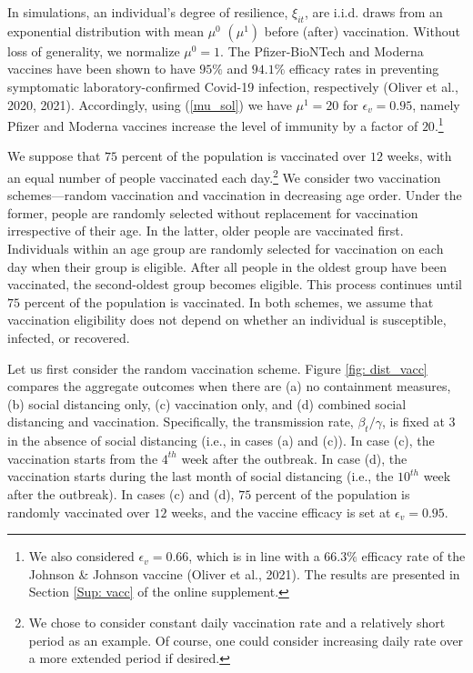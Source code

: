 \documentclass[12pt]{article}
\begin{document}
In simulations, an individual's degree of resilience, $\xi_{it}$, are i.i.d.
draws from an exponential distribution with mean $\mu^{0}$ $(\mu^{1})$ before
(after) vaccination. Without loss of generality, we normalize $\mu^{0}=1.$ The
Pfizer-BioNTech and Moderna vaccines have been shown to have $95\%$ and
$94.1\%$ efficacy rates in preventing symptomatic laboratory-confirmed
Covid-19 infection, respectively (Oliver et al., 2020, 2021). Accordingly,
using (\ref{mu_sol}) we have $\mu^{1}=20$ for $\epsilon_{v}=0.95$, namely
Pfizer and Moderna vaccines increase the level of immunity by a factor of
$20$.\footnote{We also considered $\epsilon_{v}=0.66$, which is in line with a
$66.3\%$ efficacy rate of the Johnson \& Johnson vaccine (Oliver et al.,
2021). The results are presented in Section \ref{Sup: vacc} of the online
supplement.}

We suppose that $75$ percent of the population is vaccinated over $12$ weeks,
with an equal number of people vaccinated each day.\footnote{We chose to
consider constant daily vaccination rate and a relatively short period as an
example. Of course, one could consider increasing daily rate over a more
extended period if desired.} We consider two vaccination schemes---random
vaccination and vaccination in decreasing age order. Under the former, people
are randomly selected without replacement for vaccination irrespective of
their age. In the latter, older people are vaccinated first. Individuals
within an age group are randomly selected for vaccination on each day when
their group is eligible. After all people in the oldest group have been
vaccinated, the second-oldest group becomes eligible. This process continues
until $75$ percent of the population is vaccinated. In both schemes, we assume
that vaccination eligibility does not depend on whether an individual is
susceptible, infected, or recovered.

Let us first consider the random vaccination scheme. Figure
\ref{fig: dist_vacc} compares the aggregate outcomes when there are (a) no
containment measures, (b) social distancing only, (c) vaccination only, and
(d) combined social distancing and vaccination. Specifically, the transmission
rate, $\beta_{t}/\gamma$, is fixed at $3$ in the absence of social distancing
(i.e., in cases (a) and (c)). In case (c), the vaccination starts from the
$4^{th}$ week after the outbreak$.$ In case (d), the vaccination starts during
the last month of social distancing (i.e., the $10^{th}$ week after the
outbreak). In cases (c) and (d), $75$ percent of the population is randomly
vaccinated over $12$ weeks, and the vaccine efficacy is set at $\epsilon
_{v}=0.95$.%
\end{document}
